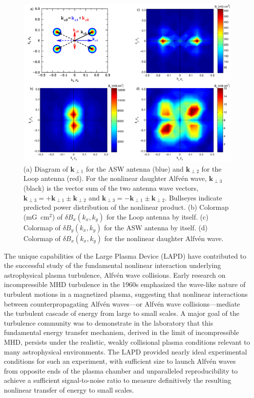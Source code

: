 \documentclass[11pt]{article}
\newcommand\Alfven{Alfv\'en }
\newcommand{\V}[1]{\mathbf{#1}}
\renewcommand{\cite}{\citep}
\begin{document}
\begin{figure}
\begin{center}
\includegraphics[width=3.5truein]{iowa}
\caption{ (a) Diagram of $\V{k}_{\perp 1}$ for the ASW
antenna (blue) and  $\V{k}_{\perp 2}$ for the Loop antenna (red).
For the nonlinear daughter \Alfven wave, $\V{k}_{\perp 3}$ (black) is
the vector sum of the two antenna wave vectors, $\V{k}_{\perp 3} = +
\V{k}_{\perp 1} \pm \V{k}_{\perp 2} $ and $\V{k}_{\perp 3} = -
\V{k}_{\perp 1} \pm \V{k}_{\perp 2} $. Bullseyes indicate predicted
power distribution of the nonlinear product.  (b) Colormap (mG~cm$^2$)
of $\delta B_x(k_x,k_y)$ for the Loop antenna by itself.  (c) Colormap
of $\delta B_y(k_x,k_y)$ for the ASW antenna by itself. (d) Colormap
of $\delta B_x(k_x,k_y)$ for the nonlinear daughter \Alfven wave.}\label{iowa}
\end{center}
\end{figure}


The unique capabilities of the Large Plasma Device (LAPD) have
contributed to the successful study of the fundamental nonlinear
interaction underlying astrophysical plasma turbulence, \Alfven wave
collisions.  Early research on incompressible MHD turbulence in the
1960s \cite{Iroshnikov:1963,Kraichnan:1965} emphasized the wave-like
nature of turbulent motions in a magnetized plasma, suggesting that
nonlinear interactions between counterpropagating \Alfven waves---or
\Alfven wave collisions---mediate the turbulent cascade of energy from
large to small scales. A major goal of the turbulence community was to
demonstrate in the laboratory that this fundamental energy transfer
mechanism, derived in the limit of incompressible MHD, persists under
the realistic, weakly collisional plasma conditions relevant to many
astrophysical environments. The LAPD provided nearly ideal
experimental conditions for such an experiment, with sufficient size
to launch \Alfven waves from opposite ends of the plasma chamber and
unparalleled reproducibility to achieve a sufficient signal-to-noise
ratio to measure definitively the resulting nonlinear transfer of
energy to small scales.
\end{document}
